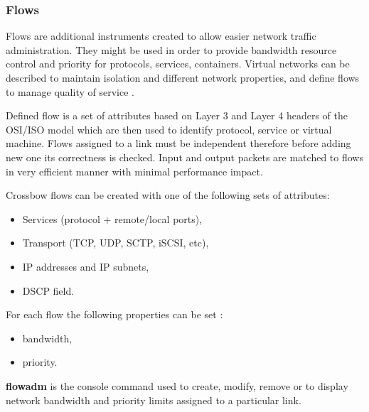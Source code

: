 \documentclass[11pt]{book}
\begin{document}
        \subsubsection{Flows}

          Flows are additional instruments created to allow easier network traffic administration. They might be used in
          order to provide bandwidth resource control and priority for protocols, services, containers. Virtual
          networks can be described to maintain isolation and different network properties, and define flows to manage quality
          of service \cite{network_virtualization}.

          Defined flow is a set of attributes based on Layer 3 and Layer 4 headers of the OSI/ISO model which are then
          used to identify protocol, service or virtual machine.  Flows assigned to a link must be independent therefore
          before adding new one its correctness is checked. Input and output packets are matched to flows in very
          efficient manner with minimal performance impact.

          \medskip

          Crossbow flows can be created with one of the following sets of attributes:

          \begin{itemize}
            \item Services (protocol + remote/local ports),
            \item Transport (TCP, UDP, SCTP, iSCSI, etc),
            \item IP addresses and IP subnets,
            \item DSCP field.
          \end{itemize}

          For each flow the following properties can be set \cite{flows2}: 

          \begin{itemize}
            \item bandwidth,
            \item priority.
          \end{itemize}

          \medskip

          

          \textbf{flowadm} is the console command used to create, modify, remove or to display network bandwidth and
          priority limits assigned to a particular link. 
\end{document}
